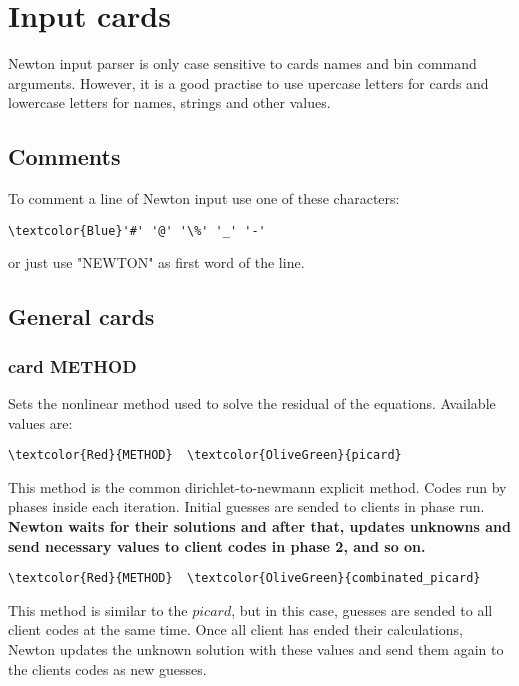 \chapter{Input cards}




Newton input parser is only case sensitive to cards names and bin command arguments. However, it is a good practise to use upercase letters for cards and lowercase letters for names, strings and other values.

\section{Comments}
To comment a line of Newton input use one of these characters:
\begin{Verbatim}[frame=single,commandchars=\\\{\}]
\textcolor{Blue}'#' '@' '\%' '_' '-'
\end{Verbatim}
or just use "NEWTON" as first word of the line.

\section{General cards}

\subsection{card METHOD}

Sets the nonlinear method used to solve the residual of the equations. Available values are: 

\begin{Verbatim}[frame=single,commandchars=\\\{\}]
\textcolor{Red}{METHOD}  \textcolor{OliveGreen}{picard} 
\end{Verbatim}
This method is the common dirichlet-to-newmann explicit method. Codes run by phases inside each iteration. Initial guesses are sended to clients in phase run. \bf{Newton} waits for their solutions and after that, updates unknowns and send necessary values to client codes in phase 2, and so on.

\begin{Verbatim}[frame=single,commandchars=\\\{\}]
\textcolor{Red}{METHOD}  \textcolor{OliveGreen}{combinated_picard} 
\end{Verbatim}
This method is similar to the $picard$, but in this case, guesses are sended to all client codes at the same time. Once all client has ended their calculations, Newton updates the unknown solution with these values and send them again to the clients codes as new guesses.

